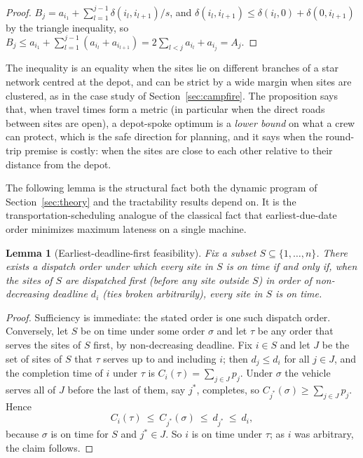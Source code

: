 \documentclass[pdflatex,sn-mathphys-ay]{sn-jnl}
\theoremstyle{thmstyleone}
\newtheorem{lemma}[theorem]{Lemma}
\theoremstyle{thmstyletwo}
\theoremstyle{thmstylethree}
\begin{document}
\begin{proof}
$B_j=a_{i_1}+\sum_{l=1}^{j-1}\delta(i_l,i_{l+1})/s$, and
$\delta(i_l,i_{l+1})\le\delta(i_l,0)+\delta(0,i_{l+1})$ by the triangle
inequality, so
$B_j\le a_{i_1}+\sum_{l=1}^{j-1}(a_{i_l}+a_{i_{l+1}})
=2\sum_{l<j}a_{i_l}+a_{i_j}=A_j$.
\end{proof}

The inequality is an equality when the sites lie on different branches of
a star network centred at the depot, and can be strict by a wide margin
when sites are clustered, as in the case study of
Section~\ref{sec:campfire}. The proposition says that, when travel times form a metric (in particular
when the direct roads between sites are open), a depot-spoke optimum is a
\emph{lower bound} on what a crew can protect, which is the safe direction
for planning, and it says when the round-trip premise is
costly: when the sites are close to each other relative to their distance
from the depot.

The following lemma is the structural fact both the dynamic program of
Section~\ref{sec:theory} and the tractability results depend on. It is
the transportation-scheduling analogue of the classical fact that
earliest-due-date order minimizes maximum lateness on a single machine.

\begin{lemma}[Earliest-deadline-first feasibility]\label{lem:edd}
Fix a subset $S \subseteq \{1,\dots,n\}$. There exists a dispatch order
under which every site in $S$ is on time if and only if, when the sites
of $S$ are dispatched first (before any site outside $S$) in order of
non-decreasing deadline $d_i$ (ties broken arbitrarily), every site in $S$
is on time.
\end{lemma}

\begin{proof}
Sufficiency is immediate: the stated order is one such dispatch order.
Conversely, let $S$ be on time under some order $\sigma$ and let $\tau$
be any order that serves the sites of $S$ first, by non-decreasing
deadline. Fix $i\in S$ and let $J$ be the set of sites of $S$ that $\tau$
serves up to and including $i$; then $d_j\le d_i$ for all $j\in J$, and
the completion time of $i$ under $\tau$ is $C_i(\tau)=\sum_{j\in J}p_j$.
Under $\sigma$ the vehicle serves all of $J$ before the last of them,
say $j^\ast$, completes, so $C_{j^\ast}(\sigma)\ge\sum_{j\in J}p_j$.
Hence
\[
C_i(\tau)\ \le\ C_{j^\ast}(\sigma)\ \le\ d_{j^\ast}\ \le\ d_i,
\]
because $\sigma$ is on time for $S$ and $j^\ast\in J$. So $i$ is on time
under $\tau$; as $i$ was arbitrary, the claim follows.
\end{proof}
\end{document}
